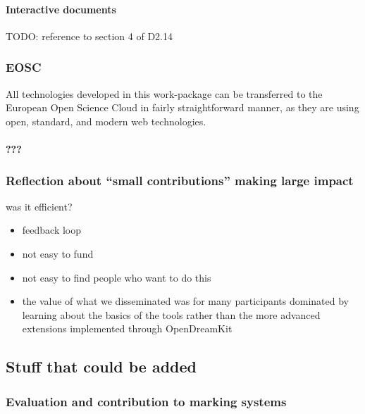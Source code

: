 \documentclass{deliverablereport}
\begin{document}
\hypertarget{interactive-documents}{%
\paragraph{Interactive documents}\label{interactive-documents}}

TODO: reference to section 4 of D2.14

\hypertarget{eosc}{%
\subsubsection{EOSC}\label{eosc}}

All technologies developed in this work-package can be transferred to
the European Open Science Cloud in fairly straightforward manner, as
they are using open, standard, and modern web technologies.

\hypertarget{section}{%
\paragraph{???}\label{section}}

\hypertarget{reflection-about-small-contributions-making-large-impact}{%
\subsubsection{Reflection about ``small contributions'' making large
impact}\label{reflection-about-small-contributions-making-large-impact}}

was it efficient?

\begin{itemize}
\tightlist
\item
  feedback loop
\item
  not easy to fund
\item
  not easy to find people who want to do this
\item
  the value of what we disseminated was for many participants dominated
  by learning about the basics of the tools rather than the more
  advanced extensions implemented through OpenDreamKit
\end{itemize}

\hypertarget{stuff-that-could-be-added}{%
\subsection{Stuff that could be added}\label{stuff-that-could-be-added}}

\hypertarget{evaluation-and-contribution-to-marking-systems}{%
\subsubsection{Evaluation and contribution to marking
systems}\label{evaluation-and-contribution-to-marking-systems}}
\end{document}
